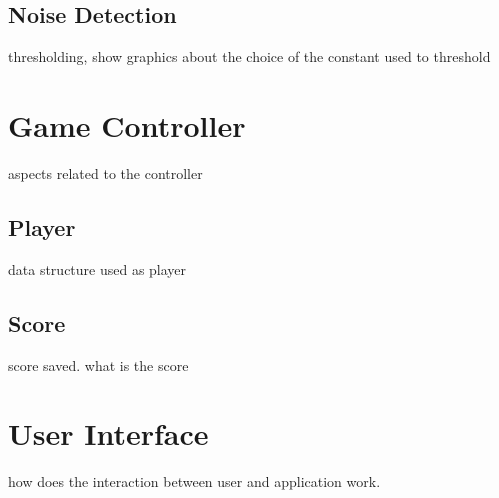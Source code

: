 \subsection{Noise Detection}

thresholding, show graphics about the choice of the constant used to threshold

\section{Game Controller}

aspects related to the controller

\subsection{Player}

data structure used as player

\subsection{Score}

score saved. what is the score

\section{User Interface}

how does the interaction between user and application work.

